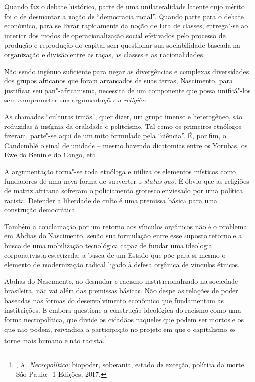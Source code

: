 Quando faz o debate histórico, parte de uma unilateralidade latente cujo
mérito foi o de desmontar a noção de ``democracia racial''. Quando parte
para o debate econômico, para se livrar rapidamente da noção de luta de
classes, entrega"-se ao interior dos modos de operacionalização social
efetivados pelo processo de produção e reprodução do capital sem
questionar sua sociabilidade baseada na organização e divisão entre as
raças, as classes e as nacionalidades.

Não sendo ingênuo suficiente para negar as divergências e complexas
diversidades dos grupos africanos que foram arrancados de suas terras,
Nascimento, para justificar seu pan"-africanismo, necessita de um
componente que possa unificá"-los sem comprometer sua argumentação:
\emph{a religião}.

As chamadas ``culturas irmãs'', quer dizer, um grupo imenso e
heterogêneo, são reduzidas à insígnia da oralidade e politeísmo. Tal
como os primeiros etnólogos fizeram, parte"-se aqui de um mito formulado
pela ``ciência''. É, por fim, o Candomblé o sinal de unidade -- mesmo
havendo dicotomias entre os Yorubas, os Ewe do Benin e do Congo, etc.

A argumentação torna"-se toda etnóloga e utiliza os elementos místicos
como fundadores de uma nova forma de subverter o \emph{status quo}. É
óbvio que as religiões de matriz africana sofreram o policiamento
grotesco enviesado por uma política racista. Defender a liberdade de
culto é uma premissa básica para uma construção democrática.

Também a conclamação por um retorno aos vínculos orgânicos não é o
problema em Abdias do Nascimento, senão sua formulação entre esse
suposto retorno e a busca de uma mobilização tecnológica capaz de fundar
uma ideologia corporativista estetizada: a busca de um Estado que põe
para si mesmo o elemento de modernização radical ligado à defesa
orgânica de vínculos étnicos.

Abdias do Nascimento, ao desnudar o racismo institucionalizado na
sociedade brasileira, não vai além das premissas básicas. Não despe as
relações de poder baseadas nas formas do desenvolvimento econômico que
fundamentam as instituições. E embora questione a construção ideológica
do racismo como uma forma necropolítica, que divide os cidadãos naqueles
que podem ser mortos e os que não podem, reivindica a participação no
projeto em que o capitalismo se torne mais humano e não
racista.\footnote{, A. \emph{Necropolítica}: biopoder, soberania,
  estado de exceção, política da morte. São Paulo: -1 Edições, 2017.}


